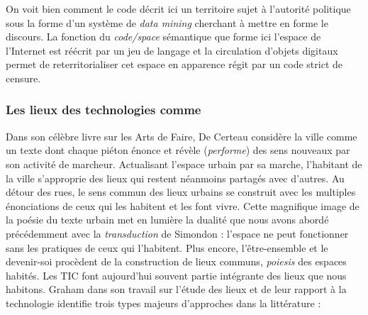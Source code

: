 On voit bien comment le code décrit ici un territoire sujet à l’autorité politique sous la forme d’un système de \textit{data mining} cherchant à mettre en forme le discours. La fonction du \textit{code/space} sémantique que forme ici l’espace de l’Internet est réécrit par un jeu de langage et la circulation d’objets digitaux permet de reterritorialiser cet espace en apparence régit par un code strict de censure. 

\subsubsection{Les lieux des technologies comme }
Dans son célèbre livre sur les Arts de Faire, De Certeau \citep{Certeau1980} considère la ville comme un texte dont chaque piéton énonce et révèle (\textit{performe}) des sens nouveaux par son activité de marcheur. Actualisant l’espace urbain par sa marche, l’habitant de la ville s’approprie des lieux qui restent néanmoins partagés avec d’autres. Au détour des rues, le sens commun des lieux urbains se construit avec les multiples énonciations de ceux qui les habitent et les font vivre. Cette magnifique image de la poésie du texte urbain met en lumière la dualité que nous avons abordé précédemment avec la \textit{transduction} de Simondon : l’espace ne peut fonctionner sans les pratiques de ceux qui l’habitent. Plus encore, l’être-ensemble et le devenir-soi procèdent de la construction de lieux communs, \textit{poiesis} des espaces habités. Les TIC font aujourd’hui souvent partie intégrante des lieux que nous habitons. Graham \citep{Graham1998} dans son travail sur l’étude des lieux et de leur rapport à la technologie identifie trois types majeurs d’approches dans la littérature :


